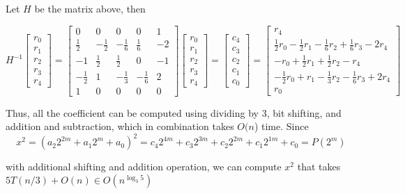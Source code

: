 Let $H$ be the matrix above, then

\[
    H^{-1} 
    \begin{bmatrix}
    r_0 \\
    r_1 \\
    r_2 \\
    r_3 \\
    r_4
    \end{bmatrix}
    =
    \begin{bmatrix}
        0 & 0 & 0 & 0 & 1 \\
        \frac{1}{2} & -\frac{1}{2} & -\frac{1}{6} & \frac{1}{6} & -2 \\
        -1 & \frac{1}{2} & \frac{1}{2} & 0 & -1 \\
        -\frac{1}{2} & 1 & -\frac{1}{3} & -\frac{1}{6} & 2 \\
        1 & 0 & 0 & 0 & 0
    \end{bmatrix}
    \begin{bmatrix}
        r_0 \\
        r_1 \\
        r_2 \\
        r_3 \\
        r_4
    \end{bmatrix}
    = 
    \begin{bmatrix}
        c_4 \\
        c_3 \\
        c_2 \\
        c_1 \\
        c_0
    \end{bmatrix}
    =
    \begin{bmatrix}
        r_4 \\
        \frac{1}{2} r_0 - \frac{1}{2} r_1 - \frac{1}{6} r_2 + \frac{1}{6} r_3 - 2r_4 \\
        -r_0 + \frac{1}{2}r_1 + \frac{1}{2}r_2 - r_4 \\
        -\frac{1}{2}r_0 + r_1 - \frac{1}{3}r_2 - \frac{1}{6}r_3 + 2r_4 \\
        r_0
    \end{bmatrix}
\]

Thus, all the coefficient can be computed using dividing by 3, bit shifting, and addition and subtraction, which in combination takes $O(n$) time.
Since
\[
    x^2 
    = (a_2 2^{2m} + a_1 2^m + a_0)^2
    = c_4 2^{4m} +  c_3 2^{3m} +  c_2 2^{2m} +  c_1 2^{1m} +  c_0
    = P(2^m)
\]

with additional shifting and addition operation, we can compute $x^2$ that takes $5T(n/3) + O(n) \in O(n^{\log_3 5})$


